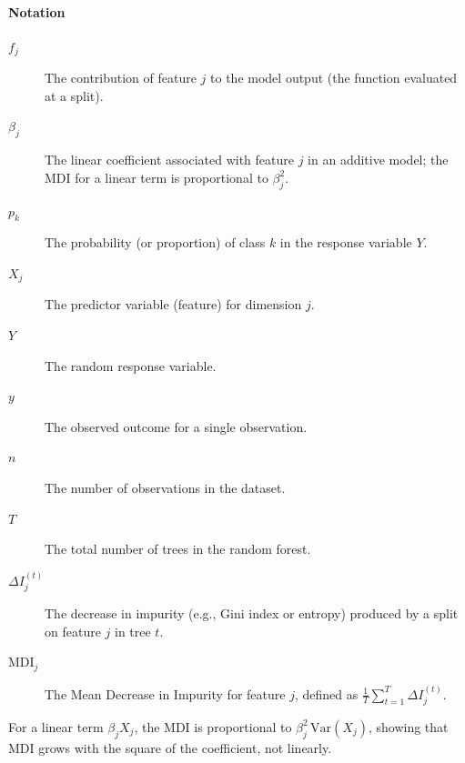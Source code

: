 \paragraph{Notation}
\begin{description}
\item[$f_j$] The contribution of feature $j$ to the model output (the function evaluated at a split).
\item[$\beta_j$] The linear coefficient associated with feature $j$ in an additive model; the MDI for a linear term is proportional to $\beta_j^2$.
\item[$p_k$] The probability (or proportion) of class $k$ in the response variable $Y$.
\item[$X_j$] The predictor variable (feature) for dimension $j$.
\item[$Y$] The random response variable.
\item[$y$] The observed outcome for a single observation.
\item[$n$] The number of observations in the dataset.
\item[$T$] The total number of trees in the random forest.
\item[$\Delta I_j^{(t)}$] The decrease in impurity (e.g., Gini index or entropy) produced by a split on feature $j$ in tree $t$.
\item[$\text{MDI}_j$] The Mean Decrease in Impurity for feature $j$, defined as $\frac{1}{T}\sum_{t=1}^{T}\Delta I_j^{(t)}$.
\end{description}

For a linear term $ \beta_j X_j$, the MDI is proportional to $\beta_j^2\,\text{Var}(X_j)$, showing that MDI grows with the square of the coefficient, not linearly.